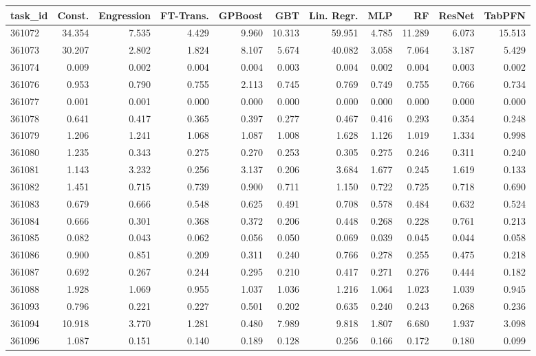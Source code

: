 \begin{tabular}{lrrrrrrrrrr}
\toprule
task\_id & Const. & Engression & FT-Trans. & GPBoost & GBT & Lin. Regr. & MLP & RF & ResNet & TabPFN \\
\midrule
361072 & 34.354 & 7.535 & 4.429 & 9.960 & 10.313 & 59.951 & 4.785 & 11.289 & 6.073 & 15.513 \\
361073 & 30.207 & 2.802 & 1.824 & 8.107 & 5.674 & 40.082 & 3.058 & 7.064 & 3.187 & 5.429 \\
361074 & 0.009 & 0.002 & 0.004 & 0.004 & 0.003 & 0.004 & 0.002 & 0.004 & 0.003 & 0.002 \\
361076 & 0.953 & 0.790 & 0.755 & 2.113 & 0.745 & 0.769 & 0.749 & 0.755 & 0.766 & 0.734 \\
361077 & 0.001 & 0.001 & 0.000 & 0.000 & 0.000 & 0.000 & 0.000 & 0.000 & 0.000 & 0.000 \\
361078 & 0.641 & 0.417 & 0.365 & 0.397 & 0.277 & 0.467 & 0.416 & 0.293 & 0.354 & 0.248 \\
361079 & 1.206 & 1.241 & 1.068 & 1.087 & 1.008 & 1.628 & 1.126 & 1.019 & 1.334 & 0.998 \\
361080 & 1.235 & 0.343 & 0.275 & 0.270 & 0.253 & 0.305 & 0.275 & 0.246 & 0.311 & 0.240 \\
361081 & 1.143 & 3.232 & 0.256 & 3.137 & 0.206 & 3.684 & 1.677 & 0.245 & 1.619 & 0.133 \\
361082 & 1.451 & 0.715 & 0.739 & 0.900 & 0.711 & 1.150 & 0.722 & 0.725 & 0.718 & 0.690 \\
361083 & 0.679 & 0.666 & 0.548 & 0.625 & 0.491 & 0.708 & 0.578 & 0.484 & 0.632 & 0.524 \\
361084 & 0.666 & 0.301 & 0.368 & 0.372 & 0.206 & 0.448 & 0.268 & 0.228 & 0.761 & 0.213 \\
361085 & 0.082 & 0.043 & 0.062 & 0.056 & 0.050 & 0.069 & 0.039 & 0.045 & 0.044 & 0.058 \\
361086 & 0.900 & 0.851 & 0.209 & 0.311 & 0.240 & 0.766 & 0.278 & 0.255 & 0.475 & 0.218 \\
361087 & 0.692 & 0.267 & 0.244 & 0.295 & 0.210 & 0.417 & 0.271 & 0.276 & 0.444 & 0.182 \\
361088 & 1.928 & 1.069 & 0.955 & 1.037 & 1.036 & 1.216 & 1.064 & 1.023 & 1.039 & 0.945 \\
361093 & 0.796 & 0.221 & 0.227 & 0.501 & 0.202 & 0.635 & 0.240 & 0.243 & 0.268 & 0.236 \\
361094 & 10.918 & 3.770 & 1.281 & 0.480 & 7.989 & 9.818 & 1.807 & 6.680 & 1.937 & 3.098 \\
361096 & 1.087 & 0.151 & 0.140 & 0.189 & 0.128 & 0.256 & 0.166 & 0.172 & 0.180 & 0.099 \\

\end{tabular}
